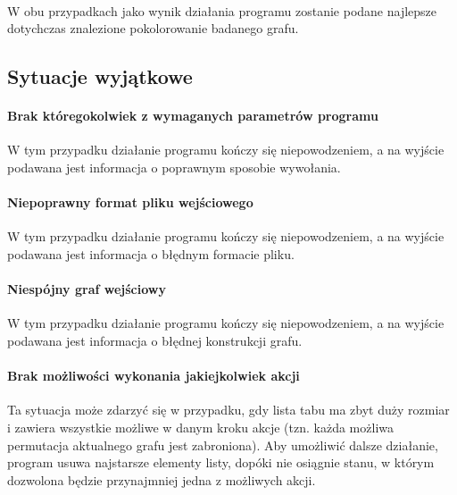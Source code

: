 \paragraph{}
W obu przypadkach jako wynik działania programu zostanie podane najlepsze dotychczas znalezione pokolorowanie badanego grafu.


\subsection{Sytuacje wyjątkowe}

\paragraph{Brak któregokolwiek z wymaganych parametrów programu}
W tym przypadku działanie programu kończy się niepowodzeniem, a na wyjście podawana jest informacja o poprawnym sposobie wywołania.

\paragraph{Niepoprawny format pliku wejściowego}
W tym przypadku działanie programu kończy się niepowodzeniem, a na wyjście podawana jest informacja o błędnym formacie pliku.

\paragraph{Niespójny graf wejściowy}
W tym przypadku działanie programu kończy się niepowodzeniem, a na wyjście podawana jest informacja o błędnej konstrukcji grafu.

\paragraph{Brak możliwości wykonania jakiejkolwiek akcji}
Ta sytuacja może zdarzyć się w przypadku, gdy lista tabu ma zbyt duży rozmiar i zawiera wszystkie możliwe w danym kroku akcje (tzn. każda możliwa permutacja aktualnego grafu jest zabroniona).
Aby umożliwić dalsze działanie, program usuwa najstarsze elementy listy, dopóki nie osiągnie stanu, w którym dozwolona będzie przynajmniej jedna z możliwych akcji.